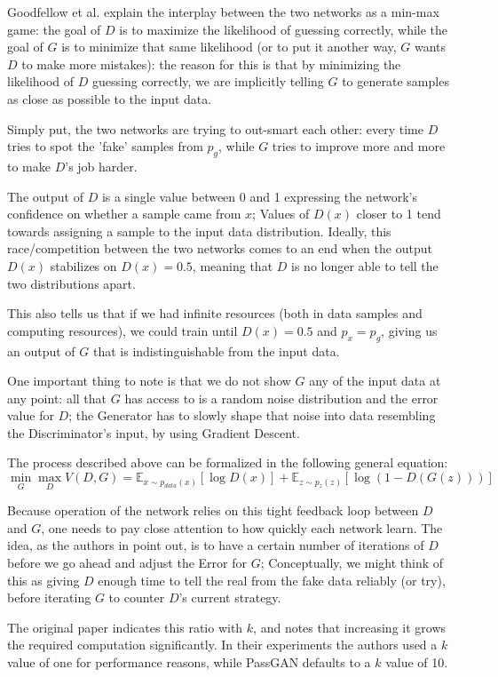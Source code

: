 Goodfellow et al.\cite{Goodfellow2014} explain the interplay between the two networks as a min-max game: the goal of $D$ is to maximize the likelihood of guessing correctly, while the goal of $G$ is to minimize that same likelihood (or to put it another way, $G$ wants $D$ to make more mistakes): the reason for this is that by minimizing the likelihood of $D$ guessing correctly, we are implicitly telling $G$ to generate samples as close as possible to the input data.

Simply put, the two networks are trying to out-smart each other: every time $D$ tries to spot the 'fake' samples from $p_g$, while $G$ tries to improve more and more to make $D$'s job harder.

The output of $D$ is a single value between 0 and 1 expressing the network's confidence on whether a sample came from $x$; Values of $D(x)$ closer to 1 tend towards assigning a sample to the input data distribution.
Ideally, this race/competition between the two networks comes to an end when the output $D(x)$ stabilizes on $D(x)=0.5$, meaning that $D$ is no longer able to tell the two distributions apart.

This also tells us that if we had infinite resources (both in  data samples and computing resources), we could train until $D(x)=0.5$ and $p_x=p_g$, giving us an output of $G$ that is indistinguishable from the input data.

One important thing to note is that we do not show $G$ any of the input data at any point: all that $G$ has access to is a random noise distribution and the error value for $D$; the Generator has to slowly shape that noise into data resembling the Discriminator's input, by using Gradient Descent.  

The process described above can be formalized in the following general equation:
\begin{equation}
 \min\limits_{G} \max\limits_{D} V(D,G)=\mathbb{E}_{x\sim p_{data}(x)}[\log{D(x)}]+\mathbb{E}_{z\sim p_z(z)}[\log{(1-D(G(z)))}] 
\end{equation} 

Because operation of the network relies on this tight feedback loop between $D$ and $G$, one needs to pay close attention to how quickly each network learn.
The idea, as the authors in \cite{Goodfellow2014} point out, is to have a certain number of iterations of $D$ before we go ahead and adjust the Error for $G$; Conceptually, we might think of this as giving $D$ enough time to tell the real from the fake data reliably (or try), before iterating $G$ to counter $D$'s current strategy.

The original paper indicates this ratio with $k$, and notes that increasing it grows the required computation significantly. In their experiments the authors used a $k$ value of one for performance reasons, while PassGAN defaults to a $k$ value of 10\cite{PassGAN}.
